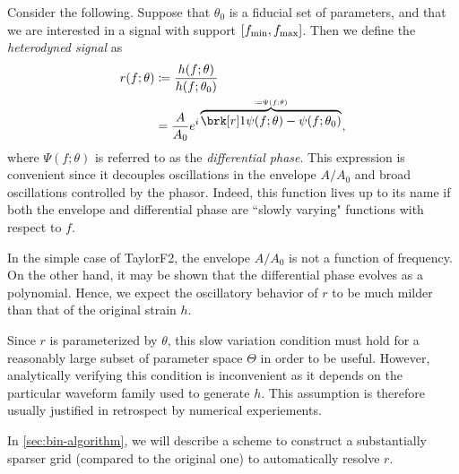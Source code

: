 Consider the following.
Suppose that $\theta_0$ is a fiducial set of parameters, and that we are interested in a signal with support $[f_{\text{min}}, f_{\text{max}}]$. Then we define the \textit{heterodyned signal} as
\begin{align*}
r(f;\theta) &\defn \frac{h(f;\theta)}{h(f; \theta_0)} \\
&= \frac{A}{A_0} e^{i \overbrace{\brk[r]1{\psi(f;\theta) - \psi(f;\theta_0)}}^{\defn \Psi(f;\theta)}},
\end{align*}
where $\Psi(f;\theta)$ is referred to as the \textit{differential phase}.
This expression is convenient since it decouples oscillations in the envelope $A/A_0$ and broad oscillations controlled by the phasor.
Indeed, this function lives up to its name if both the envelope and differential phase are ``slowly varying" functions with respect to $f$.
\begin{example}[TaylorF2]\label{}
In the simple case of TaylorF2, the envelope $A/A_0$ is not a function of frequency. On the other hand, it may be shown that the differential phase evolves as a polynomial. Hence, we expect the oscillatory behavior of $r$ to be much milder than that of the original strain $h$.
\end{example}
\begin{remark}[]\label{}
Since $r$ is parameterized by $\theta$, this slow variation condition must hold for a reasonably large subset of parameter space $\Theta$ in order to be useful.
However, analytically verifying this condition is inconvenient as it depends on the particular waveform family used to generate $h$.
This assumption is therefore usually justified in retrospect by numerical experiements.
\end{remark}

In \cref{sec:bin-algorithm}, we will describe a scheme to construct a substantially sparser grid (compared to the original one) to automatically resolve $r$.

